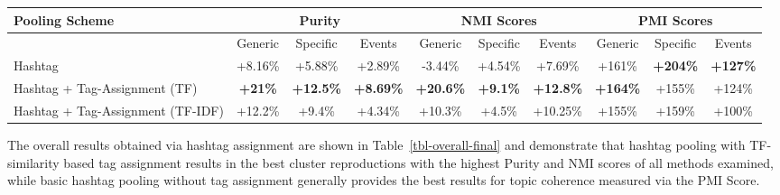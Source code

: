 \documentclass{sig-alternate}
\newcommand{\secmoveup}{\vspace{-1.mm}}
\begin{document}
\begin{table*}[t!]
\vspace{-4mm}
\caption{ Overall percentage improvement of hashtag pooling variants over unpooled scheme.}\label{tbl-overall-final}
\centering
\resizebox{17.5cm}{!} 
{
        \begin{tabular}{|l|ccc|ccc|ccc|}
        \hline
        Pooling Scheme  & \multicolumn {3}{c}{Purity} & \multicolumn {3}{c}{NMI Scores} & \multicolumn {3}{c|}{PMI Scores}\\
        \hline
         & Generic & Specific & Events &  Generic & Specific & Events &  Generic & Specific & Events\\
        \hline
        Hashtag & +8.16\% & +5.88\% & +2.89\% & -3.44\% & +4.54\% & +7.69\% & +161\% & \textbf{+204\%} & \textbf{+127\%} \\
        \hline
        Hashtag + Tag-Assignment (TF) & \textbf{+21\%} & \textbf{+12.5\%} & \textbf{+8.69\%} & \textbf{+20.6\%} & \textbf{+9.1\%} & \textbf{+12.8\%} & \textbf{+164\%} & +155\% & +124\% \\
        \hline
        Hashtag + Tag-Assignment (TF-IDF) & +12.2\% & +9.4\% & +4.34\% & +10.3\% & +4.5\% & +10.25\% & +155\% & +159\% & +100\% \\
        \hline
        \end{tabular}
}
\end{table*}

The overall results obtained via hashtag assignment are shown in
Table~\ref{tbl-overall-final} and demonstrate that hashtag pooling
with TF-similarity based tag assignment results in the best cluster
reproductions with the highest Purity and NMI scores of all methods
examined, while basic hashtag pooling without tag assignment generally
provides the best results for topic coherence measured via the PMI
Score.

\secmoveup
\end{document}
